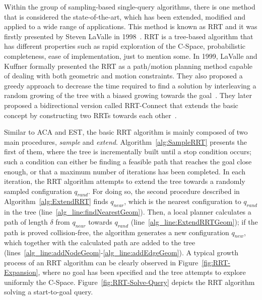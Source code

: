 Within the group of sampling-based single-query algorithms, there is one method
that is considered the state-of-the-art, which has been extended, modified and
applied to a wide range of applications. This method is known as \ac{RRT} and
it was firstly presented by Steven LaValle in 1998~\cite{LaValle1998}.
\ac{RRT} is a tree-based algorithm that has different properties such as rapid
exploration of the \ac{C-Space}, probabilistic completeness, ease of
implementation, just to mention some. In 1999, LaValle and Kuffner formally
presented the \ac{RRT} as a path/motion planning method capable of dealing with
both geometric and motion constraints. They also proposed a greedy approach to
decrease the time required to find a solution by interleaving a random growing
of the tree with a biased growing towards the
goal~\cite{LaValle1999,LaValle2000,LaValle2001}. They later proposed a
bidirectional version called RRT-Connect that extends the basic concept by
constructing two \acp{RRT} towards each other~\cite{Kuffner2000}.

Similar to \ac{ACA} and \ac{EST}, the basic \ac{RRT} algorithm is mainly
composed of two main procedures, \textit{sample} and \textit{extend}.
Algorithm~\ref{alg:SampleRRT} presents the first of them, where the tree is
incrementally built until a stop condition occurs; such a condition can either
be finding a feasible path that reaches the goal close enough, or that a maximum
number of iterations has been completed. In each iteration, the \ac{RRT}
algorithm attempts to extend the tree towards a randomly sampled configuration
$q_{rand}$. For doing so, the second procedure described in
Algorithm~\ref{alg:ExtendRRT} finds $q_{near}$, which is the nearest
configuration to $q_{rand}$ in the tree (line~\ref{alg_line:findNearestGeom}).
Then, a local planner calculates a path of length $\delta$ from $q_{near}$
towards $q_{rand}$ (line~\ref{alg_line:ExtendRRTGeom}); if the path is proved
collision-free, the algorithm generates a new configuration $q_{new}$, which
together with the calculated path are added to the tree
(lines~\ref{alg_line:addNodeGeom}-\ref{alg_line:addEdgeGeom}). A typical growth
process of an \ac{RRT} algorithm can be clearly observed in
Figure~\ref{fig:RRT-Expansion}, where no goal has been specified and the tree
attempts to explore uniformly the \ac{C-Space}.
Figure~\ref{fig:RRT-Solve-Query} depicts the \ac{RRT} algorithm solving a
start-to-goal query.

